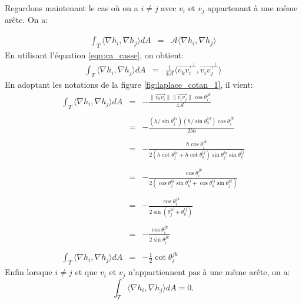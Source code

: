 Regardons maintenant le cas où on a $i\neq j$ avec $v_i$ et $v_j$ appartenant à une même arête. On a:

\[
\begin{array}{lcl}
\displaystyle\int_T \langle \nabla h_i, \nabla h_j \rangle dA &= &\mathcal{A}\langle \nabla h_i, \nabla h_j \rangle
\end{array}
\]
En utilisant l'équation \ref{eqn:ca_casse}, on obtient:
\[
\begin{array}{lcl}
\displaystyle\int_T \langle \nabla h_i, \nabla h_j \rangle dA&=& \displaystyle\frac{1}{4\mathcal{A}} \langle \overrightarrow{v_kv_i}^\perp, \overrightarrow{v_iv_j}^\perp \rangle
\end{array}
\]
En adoptant les notations de la figure \ref{fig:laplace_cotan_1}, il vient:
\[
\begin{array}{lcl}
\displaystyle\int_T \langle \nabla h_i, \nabla h_j \rangle dA&=& -\displaystyle\frac{\|\overrightarrow{v_kv_i}\|\|\overrightarrow{v_iv_j}\| \cos \theta_i^{jk}}{4\mathcal{A}}\\\\
&=& -\displaystyle\frac{(h/\sin \theta_j^{ki})(h/\sin \theta_3^{12}) \cos \theta_i^{jk}}{2bh}\\\\
&=& -\displaystyle\frac{h \cos \theta_i^{jk}}{2(h \cot \theta_j^{ki} + h \cot \theta_k^{ij}) \sin \theta_j^{ki} \sin \theta_k^{ij}}\\\\
&=& -\displaystyle\frac{\cos \theta_i^{jk}}{2(\cos \theta_j^{ki} \sin \theta_k^{ij} + \cos \theta_k^{ij} \sin \theta_j^{ki})}\\\\
&=& -\displaystyle\frac{\cos \theta_i^{jk}}{2 \sin(\theta_j^{ki} + \theta_k^{ij})}\\\\
&=& -\displaystyle\frac{\cos \theta_i^{jk}}{2 \sin \theta_i^{jk}}\\\\
\displaystyle\int_T \langle \nabla h_i, \nabla h_j \rangle dA&=& -\displaystyle\frac{1}{2}\cot \theta_i^{jk}
\end{array}
\]
Enfin lorsque $i\neq j$ et que $v_i$ et $v_j$ n'appartiennent pas à une même arête, on a:
$$\displaystyle\int_T \langle \nabla h_i, \nabla h_j \rangle dA=0.$$

